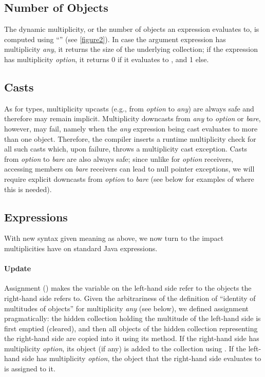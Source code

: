 {\subsection{Number of Objects}
\label{section4.4}

\noindent The dynamic multiplicity, or the number of objects an expression
evaluates to, is computed using ``\inline{|[$\something$]|}'' (see \autoref{figure2}). In case the argument
expression has multiplicity \emph{any}, it returns the size of the
underlying collection; if the expression has multiplicity
\emph{option}, it returns 0 if it evaluates to , and 1 else.

\subsection{Casts}
\label{section4.5}

As for types, multiplicity upcasts (e.g., from \emph{option} to
\emph{any}) are always safe and therefore may remain implicit.
Multiplicity downcasts from \emph{any} to \emph{option} or
\emph{bare}, however, may fail, namely when the \emph{any}
expression being cast evaluates to more than one object. Therefore, the
compiler inserts a runtime multiplicity check for all such casts which, upon
failure, throws a multiplicity cast exception. Casts from \emph{option}
to \emph{bare} are also always safe; since unlike for
\emph{option} receivers, accessing members on \emph{bare}
receivers can lead to null pointer exceptions, we will require explicit
downcasts from \emph{option} to \emph{bare} (see below for
examples of where this is needed).

\subsection{Expressions}
\label{section4.6}

\noindent With new syntax given meaning as above, we now turn to the impact
multiplicities have on standard Java expressions.

\paragraph{Update} Assignment (\inline{=}) makes the variable on the left-hand side refer to
the objects the right-hand side refers to. Given the arbitrariness of the
definition of ``identity of multitudes of objects'' for multiplicity
\emph{any} (see below), we defined assignment pragmatically: the hidden
collection holding the multitude of the left-hand side is first emptied
(cleared), and then all objects of the hidden collection representing the
right-hand side are copied into it using its  method. If the
right-hand side has multiplicity \emph{option}, its object (if any) is
added to the collection using . If the left-hand side has
multiplicity \emph{option}, the object that the right-hand side
evaluates to is assigned to it.

}
